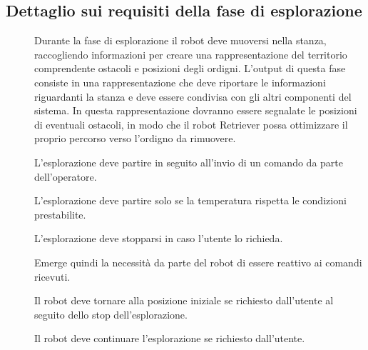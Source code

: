 \subsection{Dettaglio sui requisiti della fase di esplorazione}

\begin{description}
  \item[]

  Durante la fase di esplorazione il robot deve muoversi nella stanza, raccogliendo informazioni per creare una rappresentazione del territorio comprendente ostacoli e posizioni degli ordigni.
  L'output di questa fase consiste in una rappresentazione che deve riportare le informazioni riguardanti la stanza e deve essere condivisa con gli altri componenti del sistema.
  In questa rappresentazione dovranno essere segnalate le posizioni di eventuali ostacoli, in modo che il robot Retriever possa ottimizzare il proprio percorso verso l'ordigno da rimuovere.

  \item[]

  L'esplorazione deve partire in seguito all'invio di un comando da parte dell'operatore.

  \item[]

  L'esplorazione deve partire solo se la temperatura rispetta le condizioni prestabilite.

  \item[]

  L'esplorazione deve stopparsi in caso l'utente lo richieda.

  Emerge quindi la necessità da parte del robot di essere reattivo ai comandi ricevuti.

  \item[]

  Il robot deve tornare alla posizione iniziale se richiesto dall'utente al seguito dello stop dell'esplorazione.

  \item[]

  Il robot deve continuare l'esplorazione se richiesto dall'utente.

  \item[]


\end{description}
